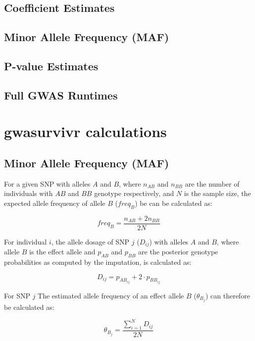 \documentclass[]{DissertateUSU}
\begin{document}
\subsection{Coefficient Estimates}\label{coefficient-estimates}

\subsection{Minor Allele Frequency
(MAF)}\label{minor-allele-frequency-maf}

\subsection{P-value Estimates}\label{p-value-estimates}

\subsection{Full GWAS Runtimes}\label{full-gwas-runtimes}

\section{gwasurvivr calculations}\label{gwasurvivr-calculations}

\subsection{Minor Allele Frequency
(MAF)}\label{minor-allele-frequency-maf-1}

For a given SNP with alleles \(A\) and \(B\), where \(n_{AB}\) and
\(n_{BB}\) are the number of individuals with \(AB\) and \(BB\) genotype
respectively, and \(N\) is the sample size, the expected allele
frequency of allele \(B\) (\(freq_B\)) be can be calculated as:

\[freq_B = \frac{ n_{AB} + 2n_{BB}}{2N}\]

For individual \(i\), the allele dosage of SNP \(j\) (\(D_{ij}\)) with
alleles \(A\) and \(B\), where allele \(B\) is the effect allele and
\(p_{AB}\) and \(p_{BB}\) are the posterior genotype probabilities as
computed by the imputation, is calculated as:

\[ D_{ij} = p_{AB_{ij}} + 2 \cdot p_{BB_{ij}} \]

For SNP \(j\) The estimated allele frequency of an effect allele \(B\)
(\(\theta_{B_j}\)) can therefore be calculated as:

\[\theta_{B_j} = \frac{\sum_{i=1}^{N} D_{ij} }{2N}\]
\end{document}
